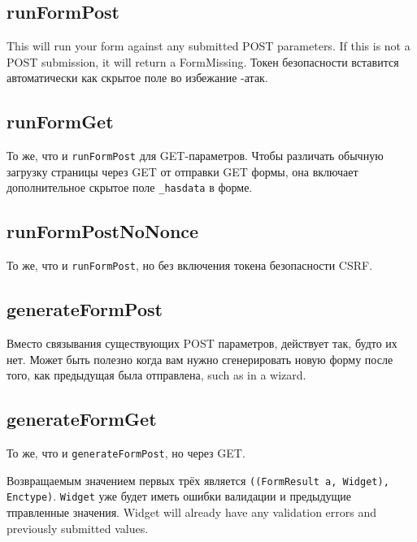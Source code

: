 \subsection{runFormPost}

This will run your form against any submitted POST parameters. If this is not a POST
submission, it will return a FormMissing. Токен безопасности вставится автоматически
как скрытое поле во избежание 
-атак.

\subsection{runFormGet}
То же, что и \lstinline'runFormPost' для GET-параметров. Чтобы различать обычную
загрузку страницы через GET от отправки GET формы, она включает дополнительное скрытое
поле \lstinline'_hasdata' в форме.

\subsection{runFormPostNoNonce}
То же, что и \lstinline'runFormPost', но без включения токена безопасности CSRF.

\subsection{generateFormPost}
Вместо связывания существующих POST параметров, действует так, будто их нет. Может
быть полезно когда вам нужно сгенерировать новую форму после того, как предыдущая была
отправлена, such as in a wizard.

\subsection{generateFormGet}

То же, что и \lstinline'generateFormPost', но через GET.

Возвращаемым значением первых трёх является \lstinline'((FormResult a, Widget), Enctype)'.
\lstinline'Widget' уже будет иметь ошибки валидации и предыдущие тправленные значения.
Widget will already have any validation errors and previously submitted values.

